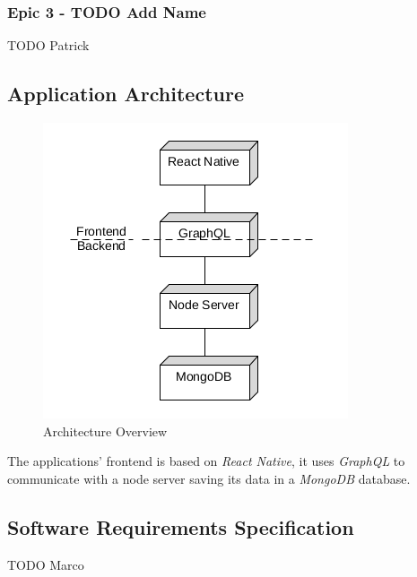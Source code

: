 \subsubsection{Epic 3 - TODO Add Name}
\label{sssec:epic3}

TODO Patrick

\subsection{Application Architecture}
\label{ssec:application_architecture}

\begin{figure}[H]
    \begin{center}
        \includegraphics[width=\textwidth/2]{images/overview.png}
        \caption{Architecture Overview}
        \label{fig:architecture_overview}
    \end{center}
\end{figure}

The applications' frontend is based on \textit{React Native}, it uses \textit{GraphQL} to communicate with a node server saving its data in a \textit{MongoDB} database.

\subsection{Software Requirements Specification}
\label{ssec:software_requirements_specification}

TODO Marco